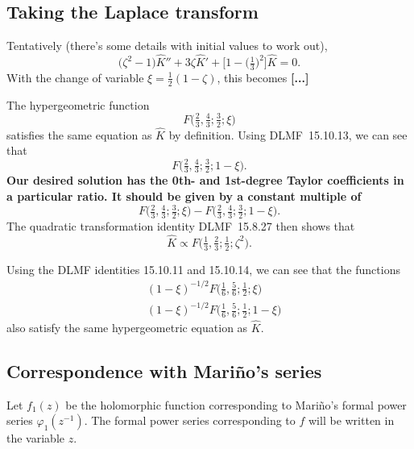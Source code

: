 \documentclass{article}
\theoremstyle{definition}
\theoremstyle{plain}
\begin{document}
\subsection{Taking the Laplace transform}
Tentatively (there's some details with initial values to work out),
\[ \big(\zeta^2 - 1\big) \hat{K}'' + 3\zeta \hat{K}' + \big[1 - \big(\tfrac{1}{3}\big)^2\big]\hat{K} = 0. \]
With the change of variable $\xi = \tfrac{1}{2}(1-\zeta)$, this becomes \textbf{[...]}

The hypergeometric function
\[ F\big(\tfrac{2}{3}, \tfrac{4}{3}; \tfrac{3}{2}; \xi\big) \]
satisfies the same equation as $\hat{K}$ by definition. Using DLMF~15.10.13, we can see that
\[ F\big(\tfrac{2}{3}, \tfrac{4}{3}; \tfrac{3}{2}; 1-\xi\big). \]
\textbf{Our desired solution has the 0th- and 1st-degree Taylor coefficients in a particular ratio. It should be given by a constant multiple of}
\[ F\big(\tfrac{2}{3}, \tfrac{4}{3}; \tfrac{3}{2}; \xi\big) - F\big(\tfrac{2}{3}, \tfrac{4}{3}; \tfrac{3}{2}; 1-\xi\big). \]
The quadratic transformation identity DLMF~15.8.27 then shows that
\[ \hat{K} \propto F\big(\tfrac{1}{3}, \tfrac{2}{3}; \tfrac{1}{2}; \zeta^2\big). \]

Using the DLMF identities 15.10.11 and 15.10.14, we can see that the functions
\begin{align*}
& (1-\xi)^{-1/2} F\big(\tfrac{1}{6}, \tfrac{5}{6}; \tfrac{1}{2}; \xi\big) \\
& (1-\xi)^{-1/2} F\big(\tfrac{1}{6}, \tfrac{5}{6}; \tfrac{1}{2}; 1-\xi\big)
\end{align*}
also satisfy the same hypergeometric equation as $\hat{K}$.
\subsection{Correspondence with Mari\~{n}o's series}
Let $f_1(z)$ be the holomorphic function corresponding to Mari\~{n}o's formal power series $\varphi_1(z^{-1})$. The formal power series corresponding to $f$ will be written in the variable $z$.
\end{document}
